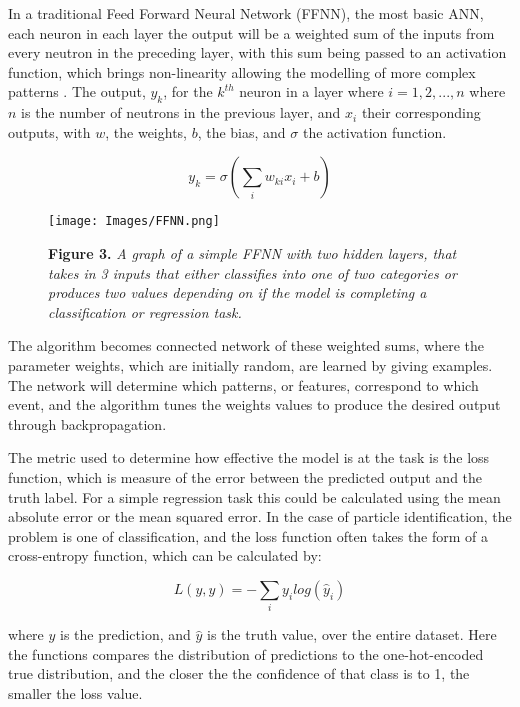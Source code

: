 \noindent In a traditional Feed Forward  Neural Network (FFNN), the most basic ANN, each neuron in each layer the output will be a weighted sum of the inputs from every neutron in the preceding layer, with this sum being passed to an activation function, which brings non-linearity allowing the modelling of more complex patterns \cite{Acciarri_2}. The output, $y_k$, for the $k^{th}$ neuron in a layer where $i = 1, 2,..., n$ where $n$ is the number of neutrons in the previous layer, and $x_{i}$ their corresponding outputs, with $w$, the weights, $b$, the bias, and $\sigma$ the activation function. \medskip

\[y_k = \sigma(\sum_{i}w_{ki} x_i +b)\]

\begin{figure}[t]
 \centering
 \texttt{[image: Images/FFNN.png]} 
 
 \textbf{Figure 3.} \textit{A graph of a simple FFNN with two hidden layers, that takes in 3 inputs that either classifies into one of two categories or produces two values depending on if the model is completing a classification or regression task. \cite{Acciarri_2}}
\end{figure}

\noindent The algorithm becomes connected network of these weighted sums, where the parameter weights, which are initially random, are learned by giving examples. The network will determine which patterns, or features, correspond to which event, and the algorithm tunes the weights values to produce the desired output through backpropagation. \medskip

\noindent The metric used to determine how effective the model is at the task is the loss function, which is measure of the error between the predicted output and the truth label. For a simple regression task this could be calculated using the mean absolute error or the mean squared error. In the case of particle identification, the problem is one of classification, and the loss function often takes the form of a cross-entropy function, which can be calculated by: 

\[L(y, \hat{y}) = - \sum_{i} y_{i} log(\hat{y}_{i})\]

\noindent where $y$ is the prediction, and $\hat{y}$ is the truth value, over the entire dataset. Here the functions compares the distribution of predictions to the one-hot-encoded true distribution, and the closer the the confidence of that class is to 1, the smaller the loss value. \medskip

